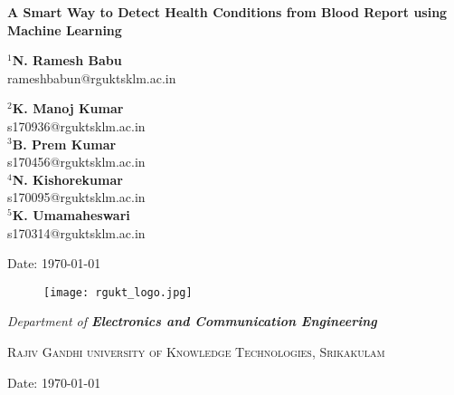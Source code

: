 \documentclass[twocolumn]{article}
\begin{document}
\begin{titlepage}
    \centering
     \onecolumn
    {\huge\bfseries A Smart Way to Detect Health Conditions from Blood Report using\\ Machine Learning\par}
    \vspace{0.5cm}
    \Large \textbf{$^1$N. Ramesh Babu\\}rameshbabun@rguktsklm.ac.in\\
  \begin{multicols}{2}
   \Large \textbf{$^2$K. Manoj Kumar\\}s170936@rguktsklm.ac.in\\
    \Large \textbf{$^3$B. Prem Kumar\\}s170456@rguktsklm.ac.in\\
     \Large \textbf{$^4$N. Kishorekumar\\}s170095@rguktsklm.ac.in\\
      \Large \textbf{$^5$K. Umamaheswari\\}s170314@rguktsklm.ac.in\\
  
  \end{multicols}
    \vspace{0.5cm}
    {\large Date: \today \par}
    \vspace{0.2cm}
    \begin{figure}[h]
	\centering
	\texttt{[image: rgukt\_logo.jpg]}
	\end{figure}
	\vspace{0.2cm}
   
    \vspace{0.5cm}
    {\Large\itshape Department of \textbf{Electronics and Communication Engineering}\par}
    \vspace{0.5cm}
   {\Large\textsc{Rajiv Gandhi university of Knowledge Technologies, Srikakulam}\par}
    \vspace{2cm}
    \begin{flushright}
    {\large Date: \today \par}
    \end{flushright}
\end{titlepage}

\pagebreak
\onecolumn
\tableofcontents %
\clearpage
\end{document}
